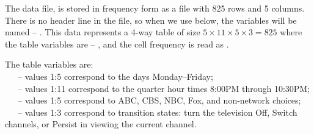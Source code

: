 \documentclass[11pt]{book}
\begin{document}
The data file,  is stored in frequency form 
as a file with 825 rows and 5 columns.  There is no header line
in the file, so when we use  below, the variables
will be named  -- .  This data represents
 a 4-way table of size
$5 \times 11 \times 5 \times 3 = 825$ where the table variables
are  -- , and the cell frequency is read
as . 

\begin{flushleft}
The table variables are:\\
~~~-- values 1:5 correspond to the days Monday--Friday;\\
~~~-- values 1:11 correspond to the quarter hour times 8:00PM through 10:30PM;\\
~~~-- values 1:5 correspond to ABC, CBS, NBC, Fox, and non-network choices;\\
~~~-- values 1:3 correspond to transition states: turn the television Off, Switch channels,  or Persist in viewing the current channel.
\end{flushleft}
\end{document}
